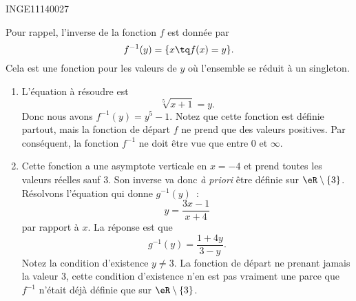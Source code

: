 

\begin{corrige}{INGE11140027}

	Pour rappel, l'inverse de la fonction $f$ est donnée par
	\begin{equation}
		f^{-1}(y)=\{ x\tq f(x)=y \}.
	\end{equation}
	Cela est une fonction pour les valeurs de $y$ où l'ensemble se réduit à un singleton.

	\begin{enumerate}

		\item
			L'équation à résoudre est
			\begin{equation}
				\sqrt[5]{x+1}=y.
			\end{equation}
			Donc nous avons $f^{-1}(y)=y^5-1$. Notez que cette fonction est définie partout, mais la fonction de départ $f$ ne prend que des valeurs positives. Par conséquent, la fonction $f^{-1}$ ne doit être vue que entre $0$ et $\infty$.

		\item
			Cette fonction a une asymptote verticale en $x=-4$ et prend toutes les valeurs réelles sauf $3$. Son inverse va donc \emph{à priori} être définie sur $\eR\setminus\{ 3 \}$. Résolvons l'équation qui donne $g^{-1}(y)$~:
			\begin{equation}
				y=\frac{ 3x-1 }{ x+4 }
			\end{equation}
			par rapport à $x$. La réponse est que
			\begin{equation}
				g^{-1}(y)=\frac{ 1+4y }{ 3-y }.
			\end{equation}
			Notez la condition d'existence $y\neq 3$. La fonction de départ ne prenant jamais la valeur $3$, cette condition d'existence n'en est pas vraiment une parce que $f^{-1}$ n'était déjà définie que sur $\eR\setminus\{ 3 \}$.	

	\end{enumerate}
	

\end{corrige}
